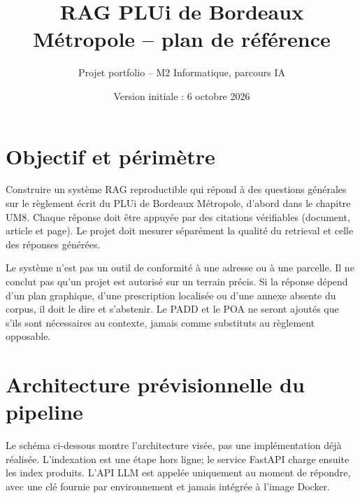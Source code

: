 \documentclass[11pt,a4paper]{article}
\title{RAG PLUi de Bordeaux Métropole -- plan de référence}
\author{Projet portfolio -- M2 Informatique, parcours IA}
\date{Version initiale : 6 octobre 2026}
\begin{document}
\maketitle

\section*{Objectif et périmètre}
Construire un système RAG reproductible qui répond à des questions générales sur le règlement écrit du PLUi de Bordeaux Métropole, d'abord dans le chapitre UM8. Chaque réponse doit être appuyée par des citations vérifiables (document, article et page). Le projet doit mesurer séparément la qualité du retrieval et celle des réponses générées.

Le système n'est pas un outil de conformité à une adresse ou à une parcelle. Il ne conclut pas qu'un projet est autorisé sur un terrain précis. Si la réponse dépend d'un plan graphique, d'une prescription localisée ou d'une annexe absente du corpus, il doit le dire et s'abstenir. Le PADD et le POA ne seront ajoutés que s'ils sont nécessaires au contexte, jamais comme substituts au règlement opposable.

\section*{Architecture prévisionnelle du pipeline}
Le schéma ci-dessous montre l'architecture visée, pas une implémentation déjà réalisée. L'indexation est une étape hors ligne; le service FastAPI charge ensuite les index produits. L'API LLM est appelée uniquement au moment de répondre, avec une clé fournie par environnement et jamais intégrée à l'image Docker.
\end{document}
